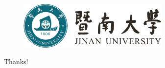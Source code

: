 \documentclass{beamer}
\begin{document}
\begin{frame}
        \begin{figure}[htpb]
      \begin{center}
            \includegraphics[width=0.4\linewidth]{pic/jnu.png}
             \end{center}
    \end{figure}
     \begin{center}
        {\Huge\calligra Thanks!}
    \end{center}
\end{frame}
\end{document}
